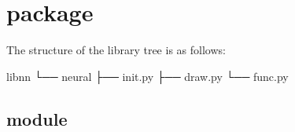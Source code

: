 \documentclass[letterpaper,10pt,english]{jupyterBook}
\begin{document}
\section{ package}
\label{\detokenize{docs/appendix:neural-package}}\label{\detokenize{docs/appendix:app-lab}}
\sphinxAtStartPar
The structure of the library tree is as follows:

\begin{sphinxVerbatim}[commandchars=\\\{\}]
lib\PYGZus{}nn
└── neural
    ├── \PYGZus{}\PYGZus{}init\PYGZus{}\PYGZus{}.py
    ├── draw.py
    └── func.py
\end{sphinxVerbatim}


\subsection{ module}
\label{\detokenize{docs/appendix:func-py-module}}
\end{document}
